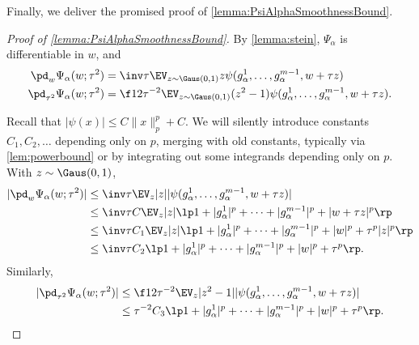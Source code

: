 \documentclass[main.tex]{subfiles}
\begin{document}
Finally, we deliver the promised proof of \cref{lemma:PsiAlphaSmoothnessBound}.

\begin{proof}[Proof of \cref{lemma:PsiAlphaSmoothnessBound}]

By \cref{lemma:stein}, $\Psi_\alpha$ is differentiable in $w$, and
\begin{align}
    \pd_w \Psi_\alpha(w; \tau^2)
    &=
        \inv \tau \EV_{z \sim \Gaus(0, 1)} z \psi(g^1_\alpha, \ldots, g^{\MM - 1}_\alpha, w+ \tau z)
        \label{eqn:PsiAlphaDW}
        \\
    \pd_{\tau^2} \Psi_\alpha(w; \tau^2)
    &=
        \f 1 2 \tau^{-2}
        \EV_{z \sim \Gaus(0, 1)} (z^2-1) \psi(g^1_\alpha, \ldots, g^{\MM - 1}_\alpha, w+ \tau z)
        .
        \label{eqn:PsiAlphaDTau2}
\end{align}

Recall that $|\psi(x)| \le C \|x\|^p_{p} + C$.
We will silently introduce constants $C_1, C_2, \ldots$ depending only on $p$, merging with old constants, typically via \cref{lem:powerbound} or by integrating out some integrands depending only on $p$.
With $z \sim \Gaus(0, 1)$,
\begin{align*}
|\pd_w \Psi_\alpha(w; \tau^2)|
    &\le
        \inv \tau \EV_{z} |z| |\psi(g^1_\alpha, \ldots, g^{\MM - 1}_\alpha, w+ \tau z)|
        \\
    &\le
        \inv \tau C\EV_z |z| \lp 1 + |g^1_\alpha|^{p} + \cdots + |g^{\MM-1}_\alpha|^p + |w + \tau z|^p \rp
        \\
    &\le
        \inv \tau C_1\EV_z |z| \lp 1 + |g^1_\alpha|^{p} + \cdots + |g^{\MM-1}_\alpha|^p + |w|^p + \tau^p |z|^p \rp
        \\
    &\le
        \inv \tau C_2 \lp 1 + |g^1_\alpha|^{p} + \cdots + |g^{\MM-1}_\alpha|^p + |w|^p + \tau^p \rp
        .
\end{align*}
Similarly,
\begin{align*}
|\pd_{\tau^2} \Psi_\alpha(w; \tau^2)|
    &\le
        \f 1 2 \tau^{-2} \EV_z |z^2-1| |\psi(g^1_\alpha, \ldots, g^{\MM - 1}_\alpha, w+ \tau z)|
        \\
    &\le
        \tau^{-2} C_3 \lp 1 + |g^1_\alpha|^{p} + \cdots + |g^{\MM-1}_\alpha|^p + |w|^p + \tau^p \rp
        .
\end{align*}


\end{proof}
\end{document}
